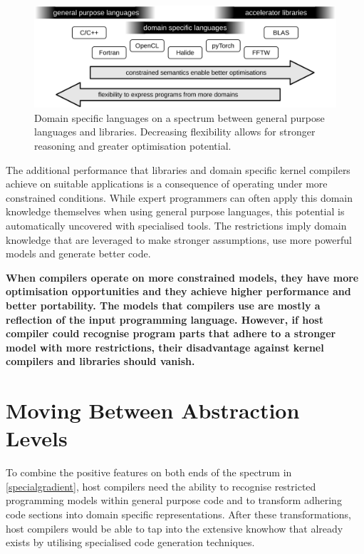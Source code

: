 \begin{figure}[t]
\centering
\includegraphics[width=\textwidth]{figures/DSLgradient}
\caption{Domain specific languages on a spectrum between general purpose
         languages and libraries.
         Decreasing flexibility allows for stronger reasoning and greater
         optimisation potential.}
\label{specialgradient}
\end{figure}

    The additional performance that libraries and domain specific kernel
    compilers achieve on suitable applications is a consequence of operating
    under more constrained conditions.
    While expert programmers can often apply this domain knowledge themselves
    when using general purpose languages, this potential is automatically
    uncovered with specialised tools.
    The restrictions imply domain knowledge that are leveraged to make stronger
    assumptions, use more powerful models and generate better code.

    {\bf
    When compilers operate on more constrained models, they have more
    optimisation opportunities and they achieve higher performance and better
    portability.
    The models that compilers use are mostly a reflection of the input
    programming language.
    However, if host compiler could recognise program parts that adhere
    to a stronger model with more restrictions, their disadvantage against
    kernel compilers and libraries should vanish.
    }

\section{Moving Between Abstraction Levels}

    To combine the positive features on both ends of the spectrum in
    \autoref{specialgradient}, host compilers need the ability to recognise
    restricted programming models within general purpose code and to transform
    adhering code sections into domain specific representations.
    After these transformations, host compilers would be able to tap into the
    extensive knowhow that already exists by utilising specialised code
    generation techniques.

